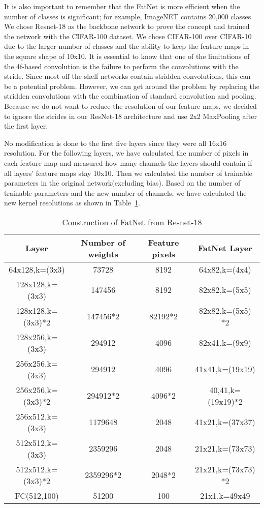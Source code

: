 \documentclass{article}
\begin{document}
It is also important to remember that the FatNet is more efficient when the number of classes is significant; for example, ImageNET contains 20,000 classes. We chose Resnet-18 as the backbone network to prove the concept and trained the network with the CIFAR-100 dataset. We chose CIFAR-100 over CIFAR-10 due to the larger number of classes and the ability to keep the feature maps in the square shape of 10x10. It is essential to know that one of the limitations of the 4f-based convolution is the failure to perform the convolutions with the stride. Since most off-the-shelf networks contain stridden convolutions, this can be a potential problem. However, we can get around the problem by replacing the stridden convolutions with the combination of standard convolution and pooling. Because we do not want to reduce the resolution of our feature maps, we decided to ignore the strides in our ResNet-18 architecture and use 2x2 MaxPooling after the first layer. 

No modification is done to the first five layers since they were all 16x16 resolution. For the following layers, we have calculated the number of pixels in each feature map and measured how many channels the layers should contain if all layers' feature maps stay 10x10. Then we calculated the number of trainable parameters in the original network(excluding bias). Based on the number of trainable parameters and the new number of channels, we have calculated the new kernel resolutions as shown in Table~\ref{tabFatNetconstruction}. 

\begin{table}[H]
\caption{Construction of FatNet from Resnet-18}
\centering
\begin{tabular}{cccc}
\toprule
\textbf{Layer}	& \textbf{Number of weights}	& \textbf{Feature pixels} & \textbf{FatNet Layer}\\
\midrule
64x128,k=(3x3)    & 73728             & 8192             & 64x82,k=(4x4)      \\
128x128,k=(3x3)   & 147456            & 8192             & 82x82,k=(5x5)      \\
128x128,k=(3x3)*2 & 147456*2          & 82192*2          & 82x82,k=(5x5) *2   \\
128x256,k=(3x3)   & 294912            & 4096             & 82x41,k=(9x9)      \\
256x256,k=(3x3)   & 294912            & 4096             & 41x41,k=(19x19)    \\
256x256,k=(3x3)*2 & 294912*2          & 4096*2           & 40,41,k=(19x19)*2  \\
256x512,k=(3x3)   & 1179648           & 2048             & 41x21,k=(37x37)    \\
512x512,k=(3x3)   & 2359296           & 2048             & 21x21,k=(73x73)    \\
512x512,k=(3x3)*2 & 2359296*2         & 2048*2           & 21x21,k=(73x73) *2 \\
FC(512,100)       & 51200             & 100              & 21x1,k=49x49       \\ \bottomrule
\end{tabular}
\label{tabFatNetconstruction}
\end{table}
\unskip
\end{document}
